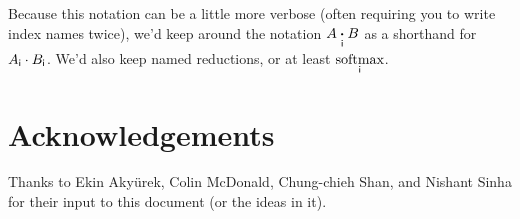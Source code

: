 \documentclass{article}
\begin{document}
Because this notation can be a little more verbose (often requiring you to write index names twice), we'd keep around the notation $A \ndot{i} B$ as a shorthand for $A_{\name{i}} \cdot B_{\name{i}}$. We'd also keep named reductions, or at least $\nfun{i}{softmax}$.

\section*{Acknowledgements}

Thanks to Ekin Aky\"{u}rek, Colin McDonald, Chung-chieh Shan, and Nishant Sinha for their input to this document (or the ideas in it).

\iffalse %
\section*{References}
\fi



\end{document}

